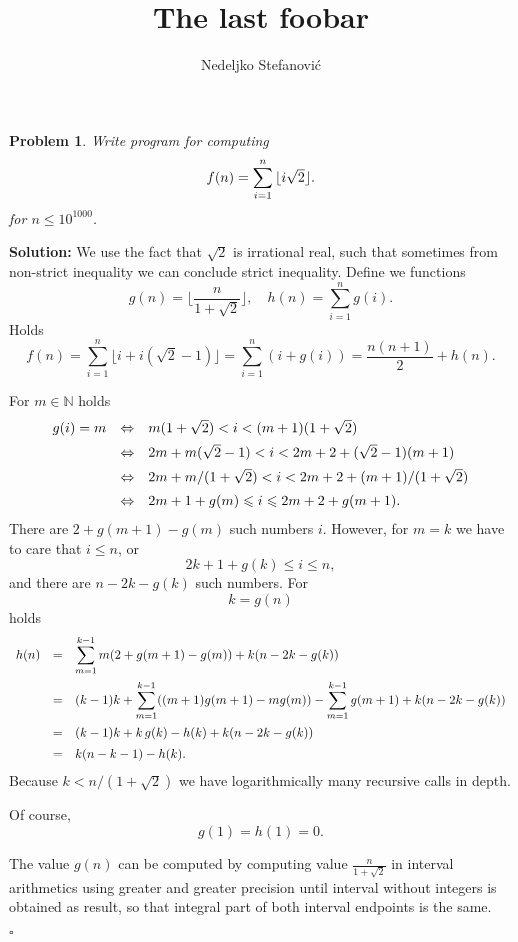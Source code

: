 \documentclass[a4paper]{article}
\title{The last foobar}
\author{Nedeljko Stefanovi\' c}
\date{}
\newtheorem{za}{Problem}
\newcommand{\res}[1]{{\bf Solution: }#1 $\square$}
\newcommand{\floor}[1]{\mbox{$\lfloor\mbox{$#1$}\rfloor$}}
\begin{document}
\maketitle

\begin{za}
	Write program for computing
	$$
	f(n)=\sum_{i=1}^n\floor{ i\sqrt 2}.
	$$
	for $n\leqslant 10^{1000}$.
\end{za}
\res{%
	We use the fact that $\sqrt 2$ is irrational real, such that sometimes from non-strict inequality we can
	conclude strict inequality.
	Define we functions
	$$
	g(n)=\floor{\frac n{1+\sqrt 2}},\quad h(n)=\sum_{i=1}^ng(i).
	$$
	Holds
	$$
	f(n)=\sum_{i=1}^n\floor{i+i(\sqrt 2-1)}=\sum_{i=1}^n(i+g(i))=\frac{n(n+1)}2+h(n).
	$$
	
	For $m\in\mathbb N$ holds
	$$
	\begin{array}{rcl}
	g(i)=m&\Leftrightarrow&m(1+\sqrt 2)<i<(m+1)(1+\sqrt 2)
	\vspace{0.5em}\\
	&\Leftrightarrow&2m+m(\sqrt 2-1)<i<2m+2+(\sqrt 2-1)(m+1)
	\vspace{0.5em}\\
	&\Leftrightarrow&2m+m/(1+\sqrt 2)<i<2m+2+(m+1)/(1+\sqrt 2)
	\vspace{0.5em}\\
	&\Leftrightarrow&2m+1+g(m)\leqslant i\leqslant 2m+2+g(m+1).
	\end{array}
	$$
	There are $2+g(m+1)-g(m)$ such numbers $i$. However, for $m=k$ we have to care that $i\leqslant n$,
	or
	$$
	2k+1+g(k)\leqslant i\leqslant n,
	$$
	and there are $n-2k-g(k)$ such numbers. For
	$$
	k=g(n)
	$$
	holds
	$$
	\begin{array}{rcl}
	h(n)
	&=&\displaystyle
	\sum_{m=1}^{k-1}m(2+g(m+1)-g(m))+k(n-2k-g(k))
	\vspace{0.5em}\\
	&=&\displaystyle
	(k-1)k+\sum_{m=1}^{k-1}((m+1)g(m+1)-mg(m))-\sum_{m=1}^{k-1}g(m+1)+k(n-2k-g(k))
	\vspace{0.5em}\\
	&=&\displaystyle
	(k-1)k+k\,g(k)-h(k)+k(n-2k-g(k))
	\vspace{0.5em}\\
	&=&\displaystyle
	k(n-k-1)-h(k).
	\end{array}
	$$
	Because $k<n/(1+\sqrt 2)$ we have logarithmically many recursive calls in depth.
	
	Of course,
	$$
	g(1)=h(1)=0.
	$$
	
	The value $g(n)$ can be computed by computing value $\frac n{1+\sqrt 2}$ in interval arithmetics
	using greater and greater precision until interval without integers is obtained as result,
	so that integral part of both interval endpoints is the same.
	
}
\end{document}
